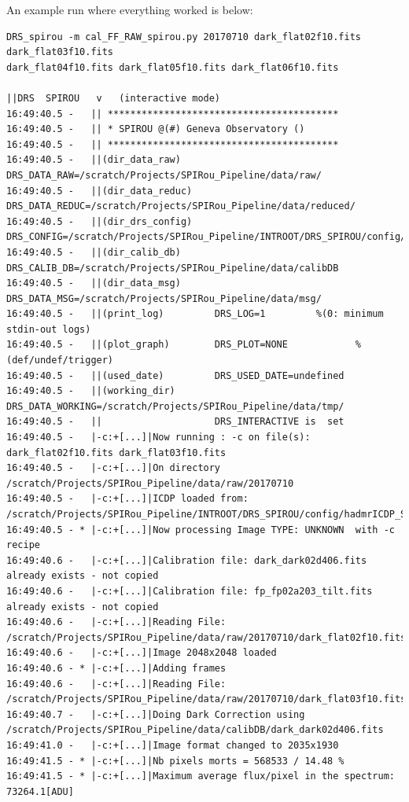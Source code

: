 An example run where everything worked is below:

\begin{lstlisting}[style=text]
DRS_spirou -m cal_FF_RAW_spirou.py 20170710 dark_flat02f10.fits dark_flat03f10.fits
dark_flat04f10.fits dark_flat05f10.fits dark_flat06f10.fits

||DRS  SPIROU   v   (interactive mode)
16:49:40.5 -   || *****************************************
16:49:40.5 -   || * SPIROU @(#) Geneva Observatory ()
16:49:40.5 -   || *****************************************
16:49:40.5 -   ||(dir_data_raw)      DRS_DATA_RAW=/scratch/Projects/SPIRou_Pipeline/data/raw/
16:49:40.5 -   ||(dir_data_reduc)    DRS_DATA_REDUC=/scratch/Projects/SPIRou_Pipeline/data/reduced/
16:49:40.5 -   ||(dir_drs_config)    DRS_CONFIG=/scratch/Projects/SPIRou_Pipeline/INTROOT/DRS_SPIROU/config/
16:49:40.5 -   ||(dir_calib_db)      DRS_CALIB_DB=/scratch/Projects/SPIRou_Pipeline/data/calibDB
16:49:40.5 -   ||(dir_data_msg)      DRS_DATA_MSG=/scratch/Projects/SPIRou_Pipeline/data/msg/
16:49:40.5 -   ||(print_log)         DRS_LOG=1         %(0: minimum stdin-out logs)
16:49:40.5 -   ||(plot_graph)        DRS_PLOT=NONE            %(def/undef/trigger)
16:49:40.5 -   ||(used_date)         DRS_USED_DATE=undefined
16:49:40.5 -   ||(working_dir)       DRS_DATA_WORKING=/scratch/Projects/SPIRou_Pipeline/data/tmp/
16:49:40.5 -   ||                    DRS_INTERACTIVE is  set
16:49:40.5 -   |-c:+[...]|Now running : -c on file(s):  dark_flat02f10.fits dark_flat03f10.fits
16:49:40.5 -   |-c:+[...]|On directory /scratch/Projects/SPIRou_Pipeline/data/raw/20170710
16:49:40.5 -   |-c:+[...]|ICDP loaded from: /scratch/Projects/SPIRou_Pipeline/INTROOT/DRS_SPIROU/config/hadmrICDP_SPIROU.py
16:49:40.5 - * |-c:+[...]|Now processing Image TYPE: UNKNOWN  with -c recipe
16:49:40.6 -   |-c:+[...]|Calibration file: dark_dark02d406.fits already exists - not copied
16:49:40.6 -   |-c:+[...]|Calibration file: fp_fp02a203_tilt.fits already exists - not copied
16:49:40.6 -   |-c:+[...]|Reading File: /scratch/Projects/SPIRou_Pipeline/data/raw/20170710/dark_flat02f10.fits
16:49:40.6 -   |-c:+[...]|Image 2048x2048 loaded
16:49:40.6 - * |-c:+[...]|Adding frames
16:49:40.6 -   |-c:+[...]|Reading File: /scratch/Projects/SPIRou_Pipeline/data/raw/20170710/dark_flat03f10.fits
16:49:40.7 -   |-c:+[...]|Doing Dark Correction using /scratch/Projects/SPIRou_Pipeline/data/calibDB/dark_dark02d406.fits
16:49:41.0 -   |-c:+[...]|Image format changed to 2035x1930
16:49:41.5 - * |-c:+[...]|Nb pixels morts = 568533 / 14.48 %
16:49:41.5 - * |-c:+[...]|Maximum average flux/pixel in the spectrum: 73264.1[ADU]

\end{lstlisting}
